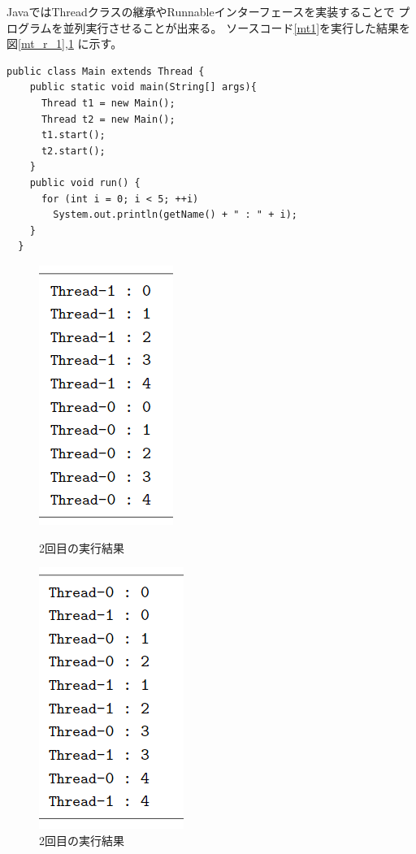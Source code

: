 \documentclass[dvipdfmx]{jsarticle}
\begin{document}
JavaではThreadクラスの継承やRunnableインターフェースを実装することで
プログラムを並列実行させることが出来る。
ソースコード\ref{mt1}を実行した結果を図\ref{mt_r_1},\ref{mt_r_2}
に示す。
\begin{lstlisting}[caption=マルチスレッドの例,label=mt1]
  public class Main extends Thread {
    public static void main(String[] args){
      Thread t1 = new Main();
      Thread t2 = new Main();
      t1.start();
      t2.start();
    }
    public void run() {
      for (int i = 0; i < 5; ++i)
        System.out.println(getName() + " : " + i);
    }
  }  
\end{lstlisting}
\begin{figure}[H]
  \begin{minipage}{0.5\hsize}
    \begin{center}
      \includegraphics[width=0.4\hsize]{../pic/3_1.png}
    \end{center}
    \caption{2回目の実行結果}
    \label{mt_r_1}
  \end{minipage}
  \begin{minipage}{0.5\hsize}
    \begin{center}
      \includegraphics[width=0.4\hsize]{../pic/3_2.png}
    \end{center}
    \caption{2回目の実行結果}
    \label{mt_r_2}
  \end{minipage}
\end{figure}
\end{document}
